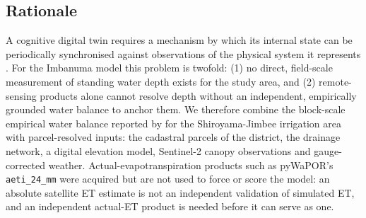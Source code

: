 \documentclass{article}
\begin{document}
\subsection{Rationale}
\begin{changed}
A cognitive digital twin requires a mechanism by which its internal state can be periodically synchronised against observations of the physical system it represents \citep{Tao2019DigitalTwin, Jones2020DigitalTwin}. For the Imbanuma model this problem is twofold: (1) no direct, field-scale measurement of standing water depth exists for the study area, and (2) remote-sensing products alone cannot resolve depth without an independent, empirically grounded water balance to anchor them. We therefore combine the block-scale empirical water balance reported by \cite{Okura2025WaterBalance} for the Shiroyama-Jimbee irrigation area with parcel-resolved inputs: the cadastral parcels of the district, the drainage network, a digital elevation model, Sentinel-2 canopy observations and gauge-corrected weather. Actual-evapotranspiration products such as pyWaPOR's \texttt{aeti\_24\_mm} were acquired but are not used to force or score the model: an absolute satellite ET estimate is not an independent validation of simulated ET, and an independent actual-ET product is needed before it can serve as one.
\end{changed}
\end{document}
